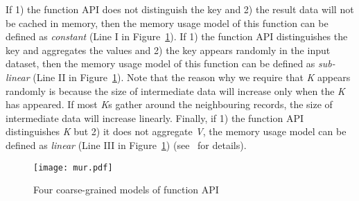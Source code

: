 If 1) the function API does not distinguish the key and 2)
the result data will not be cached in memory, then the memory
usage model of this function can be defined as \textit{constant} (Line
I in Figure~\ref{fig:mur}). If 1) the function API distinguishes the key and aggregates the values and 2) the key appears randomly in the
input dataset, then the memory usage model of this function can
be defined as \textit{sub-linear} (Line II in Figure~\ref{fig:mur}). Note that the
reason why we require that \textit{K} appears randomly is because
the size of intermediate data will increase only when the \textit{K}
has appeared. If most \textit{K}s gather around the neighbouring
records, the size of intermediate data will increase linearly.
Finally, if 1) the function API distinguishes \textit{K} but 2) it does not
aggregate \textit{V}, the memory usage model can be defined as
\textit{linear} (Line III in Figure~\ref{fig:mur}) (see~\cite{full} for details).

\begin{figure}[!t]
\centering
\texttt{[image: mur.pdf]}
\vspace{-2mm}
\caption{Four coarse-grained models of function API}
\vspace{-4mm}
\label{fig:mur}
\end{figure}

